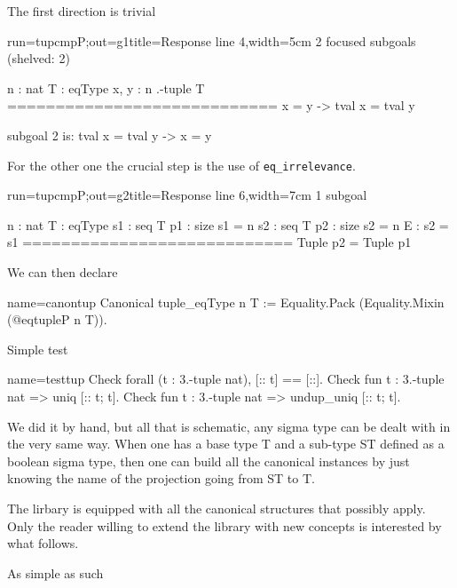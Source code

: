 The first direction is trivial

\begin{coqout}{run=tupcmpP;out=g1}{title=Response line 4,width=5cm}
2 focused subgoals (shelved: 2)

n : nat
T : eqType
x, y : n .-tuple T
============================
x = y -> tval x = tval y

subgoal 2 is:
  tval x = tval y -> x = y
\end{coqout}

For the other one the crucial step is the use
of \lstinline/eq_irrelevance/.

\begin{coqout}{run=tupcmpP;out=g2}{title=Response line 6,width=7cm}
1 subgoal

n : nat
T : eqType
s1 : seq T
p1 : size s1 = n
s2 : seq T
p2 : size s2 = n
E : s2 = s1
============================
Tuple p2 = Tuple p1
\end{coqout}

We can then declare

\begin{coq}{name=canontup}{}
Canonical tuple_eqType n T :=
  Equality.Pack (Equality.Mixin (@eqtupleP n T)).
\end{coq}

Simple test

\begin{coq}{name=testtup}{}
Check forall (t : 3.-tuple nat), [:: t] == [::].
Check fun t : 3.-tuple nat => uniq [:: t; t].
Check fun t : 3.-tuple nat => undup_uniq [:: t; t].
\end{coq}

We did it by hand, but all that is schematic, any sigma type can be
dealt with in the very same way.  When one has a base type T and a
sub-type ST defined as a boolean sigma type, then one can build all
the canonical instances by just knowing the name of the projection
going from ST to T.

The lirbary is equipped with all the canonical structures that
possibly apply.  Only the reader willing to extend the library with
new concepts is interested by what follows.

\mcbREQUIRE{}

As simple as such

